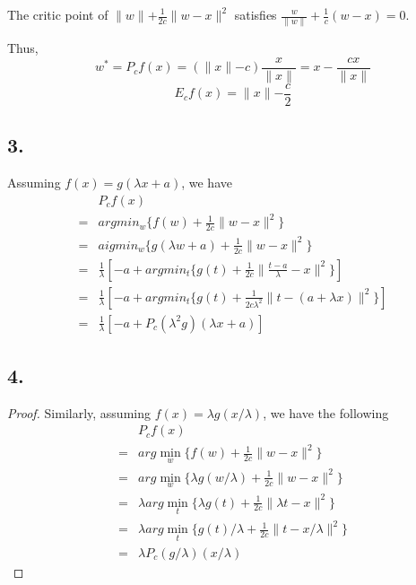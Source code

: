 \documentclass{article}
\begin{document}
The critic point of $\parallel w \parallel +\frac{1}{2c} \parallel w-x \parallel^2$ satisfies $\frac{w}{\parallel w \parallel}+ \frac{1}{c}(w-x)=0$.

Thus, $$w^* = P_c f(x)= (\parallel x \parallel - c)\frac{x}{\parallel x \parallel}=x - \frac{cx}{\parallel x \parallel}$$ $$E_cf(x)=\parallel x \parallel - \frac{c}{2}$$
\subsection{3.} 
Assuming $f(x) = g(\lambda x + a)$, we have
\begin{align*}
    & P_cf(x)\\
    = & argmin_w\{f(w)+\frac{1}{2c}\parallel w-x \parallel ^2\}\\
    = & aigmin_w\{g(\lambda w+a)+\frac{1}{2c}\parallel w-x \parallel ^2 \}\\
    = & \frac{1}{\lambda}[-a + argmin_t\{g(t)+\frac{1}{2c}\parallel \frac{t-a}{\lambda}-x \parallel ^2\}]\\
    = & \frac{1}{\lambda}[-a + argmin_t\{g(t)+\frac{1}{2c\lambda^2}\parallel t-(a+\lambda x) \parallel ^2\}]\\
    = & \frac{1}{\lambda}[-a + P_c(\lambda^2g)(\lambda x+a)]
\end{align*}


\subsection{4.}
\begin{proof}
Similarly, assuming $f(x)=\lambda g(x/ \lambda)$, we have the following
\begin{align*}
    & P_cf(x)\\
    = & arg\min_w\{f(w)+\frac{1}{2c}\parallel w-x \parallel ^2\}\\
    = & arg\min_w\{\lambda g(w/\lambda)+\frac{1}{2c}\parallel w-x \parallel ^2\}\\
    = & \lambda arg\min_t\{\lambda g(t)+\frac{1}{2c}\parallel \lambda t-x \parallel ^2\}\\
    = & \lambda arg\min_t\{g(t)/\lambda +\frac{1}{2c}\parallel  t-x/\lambda \parallel ^2\}\\
    = & \lambda P_c(g/\lambda)(x/\lambda)
\end{align*}
\end{proof}
\end{document}
